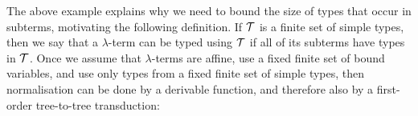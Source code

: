 \begin{example}
\end{example}

The above example explains why we need to bound the size of types that occur in subterms, motivating the following definition. If ${\mathcal T}$ is a finite set of simple types, then   we say that a $\lambda$-term can be typed using ${\mathcal T}$ if all of its  subterms have types in $\mathcal T$.  Once we assume that $\lambda$-terms are affine, use a fixed finite set of bound variables, and use only types from a fixed finite set of simple types, then normalisation can be done by a derivable function, and therefore also by a first-order tree-to-tree transduction: 

